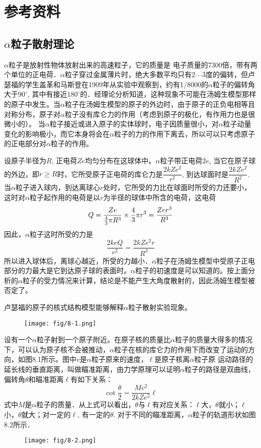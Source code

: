 \section{参考资料}

\subsection{$\alpha$粒子散射理论}

$\alpha$粒子是放射性物体放射出来的高速粒子，它的质量是
电子质量的7300倍，带有两个单位的正电荷．$\alpha$粒子穿过金属薄片时，绝大多数平均只有2—3度的偏转，但卢瑟福的学生盖革和马斯登在1909年从实验中观察到，约有1/8000的$\alpha$粒子的偏转角大于$90^{\circ}$, 其中有接近$180^{\circ}$的．经理论分析知道，这种现象不可能在汤姆生模型那样的原子中发生。当$\alpha$粒子在汤姆生模型的原子的外边时，由于原子的正负电相等且对称分布，原子对$\alpha$粒子没有库仑力的作用（考虑到原子的极化，有作用力也是很微小的）。 当$\alpha$粒子接近或进入原子的实体球时，电子因质量很小，对$\alpha$粒子动量变化的影响极小，而它本身将会在$\alpha$粒子的力的作用下离去，所以可以只考虑原子的正电部分对$\alpha$粒子的作用。

设原子半径为$R$, 正电荷$Ze$均匀分布在这球体中。$\alpha$粒子带正电荷$2e$, 当它在原子球的外边，即$r\ge R$时，它所受原子正电荷的库仑力是$\dfrac{2kZe^2}{r^2}$, 到达球面时是$\dfrac{2kZe^2}{R^2}$. 当$\alpha$粒子进入球内，到达离球心$r$处时，它所受的力比在球面时所受的力还要小，这时对$\alpha$粒子起作用的电荷是以$r$为半径的球体中所含的电荷，这电荷
\[Q=\frac{Ze}{\frac{4}{3}\pi R^3}\times \frac{4}{3}\pi r^3=\frac{Zer^3}{R^3}\]
因此，$\alpha$粒子这时所受的力是
\[\frac{2keQ}{r^2}=\frac{2kZe^2r}{R^3}\]
所以进入球体后，离球心越近，所受的力越小．$\alpha$粒子在汤姆生模型中受原子正电部分的力最大是它到达原子球的表面时。$\alpha$粒子的初速度是可以知道的。按上面分析的$\alpha$粒子的受力情况来计算，结论是不能产生大角度散射的，因此汤姆生模型被否定了。

卢瑟福的原子的核式结构模型能够解释$\alpha$粒子散射实验现象。

\begin{figure}[htp]
    \centering
   \texttt{[image: fig/8-1.png]}
    \caption{}
\end{figure}

设有一个$\alpha$粒子射到一个原子附近。在原子核的质量比$\alpha$粒子的质量大得多的情况下，可以认为原子核不会被推动，$\alpha$粒子在核的库仑力的作用下而改变了运动的方向，如图8.1所示。图中$v$是$\alpha$粒子原来的速度，$\ell$是原子核离$\alpha$粒子原
运动路径的延长线的垂直距离，叫做瞄准距离，由力学原理可以证明$\alpha$粒子的路径是双曲线，偏转角$\theta$和瞄准距离$\ell$有如下关系：
\begin{equation}
    \cot\frac{\theta}{2}=\frac{Mv^2}{2kZe^2}\ell
\end{equation}
式中$M$是$\alpha$粒子的质量．从上式可以看出，$\theta$与$\ell$有对应关系：$\ell$大，$\theta$就小；$\ell$小，$\theta$就大；对一定的$\ell$, 有一定的$\theta$. 对于不同的瞄准距离，$\alpha$粒子的轨道形状如图8.2所示．
\begin{figure}[htp]
    \centering
    \texttt{[image: fig/8-2.png]}
    \caption{}
\end{figure}

